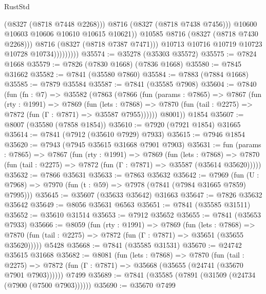 \begin{lexlean}{RustStd}
\begin{coremodule}
{\begin{coremodule}
{{{{{{{{{{{{{{{{{{{{{{{{{{{{{{{{{{{{{{{{{{{{{{{{{{{{{{                                  (@8327 (@8718 @7448 @2268)))
                                @8716
                                (@8327 (@8718 @7438 @7456)))
                              @10600
                              @10603
                              @10606
                              @10610
                              @10615
                              @10621))
                          @10585
                          @8716
                          (@8327 (@8718 @7430 @2268)))
                        @8716
                        (@8327 (@8718 @7387 @7471)))
                      @10713
                      @10716
                      @10719
                      @10723
                      @10728
                      @10734)))))))))
@35574 := @35278 (@35303 @35572)
@35575 := @7824 @1668
@35579 := @7826 (@7830 @1668) (@7836 @1668)
@35580 := @7845 @31662
@35582 := @7841 (@35580 @7860)
@35584 := @7883 (@7884 @1668)
@35585 := @7879 @35584
@35587 := @7841 (@35585 @7908)
@35604 := @7840
    (fun (fn : @7) =>
    @35582
      (@7863
        (@7866
          (fun (params : @7865) =>
          @7867
            (fun (rty : @1991) =>
            @7869
              (fun (lets : @7868) =>
              @7870 (fun (tail : @2275) => @7872 (fun (Γ : @7871) => @35587 @7955))))))
        @8001))
    @1854
@35607 := @8007 (@35580 (@7858 @1854))
@35610 := @7920 (@7921 @1854) @31665
@35614 := @7841 (@7912 (@35610 @7929) @7933)
@35615 := @7946 @1854
@35620 := @7943 (@7945 @35615 @31668 @7901 @7903)
@35631 := fun (params : @7865) =>
  @7867
    (fun (rty : @1991) =>
    @7869
      (fun (lets : @7868) =>
      @7870 (fun (tail : @2275) => @7872 (fun (Γ : @7871) => @35587 (@35614 @35620)))))
@35632 := @7866 @35631
@35633 := @7863 @35632
@35642 := @7969
    (fun (U : @7968) => @7970 (fun (t : @59) => @7978 (@7841 (@7984 @31665 @7859) @7995)))
@35645 := @35607 (@35633 @35642) @31663
@35647 := @7826 @35632 @35642
@35649 := @8056 @35631 @6563
@35651 := @7841 (@35585 @31511)
@35652 := @35610 @31514
@35653 := @7912 @35652
@35655 := @7841 (@35653 @7933)
@35666 := @8059
    (fun (rty : @1991) =>
    @7869
      (fun (lets : @7868) =>
      @7870 (fun (tail : @2275) => @7872 (fun (Γ : @7871) => @35651 (@35655 @35620)))))
    @5428
@35668 := @7841 (@35585 @31531)
@35670 := @24742 @35615 @31668
@35682 := @8081
    (fun (lets : @7868) =>
    @7870
      (fun (tail : @2275) =>
      @7872 (fun (Γ : @7871) => @35668 (@35655 (@24741 (@35670 @7901 @7903))))))
    @7499
@35689 := @7841 (@35585 (@7891 (@31509 (@24734 (@7900 (@7500 @7903))))))
@35690 := @35670 @7499
}}}}}}}}}}}}}}}}}}}}}}}}}}}}}}}}}}}}}}}}}}}}}}}}}}}}}}
\end{coremodule}}
\end{coremodule}
\end{lexlean}
